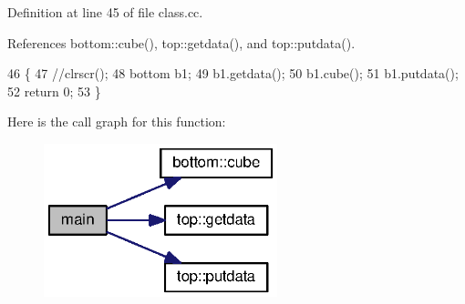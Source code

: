 Definition at line 45 of file class.\-cc.



References bottom\-::cube(), top\-::getdata(), and top\-::putdata().


\begin{DoxyCode}
46 \{
47 \textcolor{comment}{//clrscr();}
48 bottom b1;
49 b1.getdata();
50 b1.cube();
51 b1.putdata();
52 \textcolor{keywordflow}{return} 0;
53 \}
\end{DoxyCode}


Here is the call graph for this function\-:\nopagebreak
\begin{figure}[H]
\begin{center}
\leavevmode
\includegraphics[width=192pt]{class_8cc_ae66f6b31b5ad750f1fe042a706a4e3d4_cgraph}
\end{center}
\end{figure}


